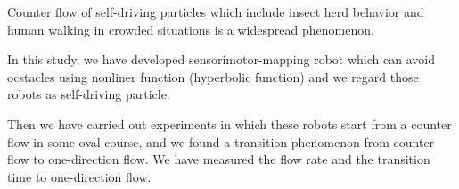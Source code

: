 Counter flow of self-driving particles which include insect herd behavior and 
human walking in crowded situations is a widespread phenomenon.

In this study, we have developed sensorimotor-mapping robot which can avoid 
ocstacles using nonliner function (hyperbolic function) and we regard those 
robots as self-driving particle.

Then we have carried out experiments in which these robots start from a counter flow 
in some oval-course, and we found a transition phenomenon from counter
flow to one-direction flow.
We have measured the flow rate and the transition time to 
one-direction flow. 
